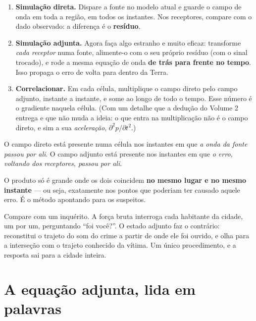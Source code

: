\documentclass[11pt,a4paper,oneside]{report}
\begin{document}
\begin{enumerate}[leftmargin=*]
\item \textbf{Simula\c{c}\~ao direta.} Dispare a fonte no modelo atual e
guarde o campo de onda em toda a regi\~ao, em todos os instantes. Nos
receptores, compare com o dado observado: a diferen\c{c}a \'e o
\textbf{res\'iduo}.
\item \textbf{Simula\c{c}\~ao adjunta.} Agora fa\c{c}a algo estranho e muito
eficaz: transforme \emph{cada receptor} numa fonte, alimente-o com o seu
pr\'oprio res\'iduo (com o sinal trocado), e rode a mesma equa\c{c}\~ao de
onda \textbf{de tr\'as para frente no tempo}. Isso propaga o erro de volta
para dentro da Terra.
\item \textbf{Correlacionar.} Em cada c\'elula, multiplique o campo direto
pelo campo adjunto, instante a instante, e some ao longo de todo o tempo. Esse
n\'umero \'e o gradiente naquela c\'elula. (Com um detalhe que a dedu\c{c}\~ao
do Volume 2 entrega e que n\~ao muda a ideia: o que entra na multiplica\c{c}\~ao
n\~ao \'e o campo direto, e sim a sua \emph{acelera\c{c}\~ao},
$\partial^{2}p/\partial t^{2}$.)
\end{enumerate}

\begin{teoria}
O campo direto est\'a presente numa c\'elula nos instantes em que \emph{a
onda da fonte passou por ali}. O campo adjunto est\'a presente nos instantes
em que \emph{o erro, voltando dos receptores, passou por ali}.

O produto s\'o \'e grande onde os dois coincidem \textbf{no mesmo lugar e no
mesmo instante} --- ou seja, exatamente nos pontos que poderiam ter causado
aquele erro. \'E o m\'etodo apontando para os suspeitos.
\end{teoria}

\begin{analogia}
Compare com um inqu\'erito. A for\c{c}a bruta interroga cada habitante da
cidade, um por um, perguntando ``foi voc\^e?''. O estado adjunto faz o
contr\'ario: reconstitui o trajeto do som do crime a partir de onde ele foi
ouvido, e olha para a interse\c{c}\~ao com o trajeto conhecido da v\'itima. Um
\'unico procedimento, e a resposta sai para a cidade inteira.
\end{analogia}

\section{A equa\c{c}\~ao adjunta, lida em palavras}
\end{document}
